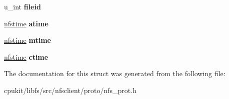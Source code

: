 \begin{DoxyCompactItemize}
u\+\_\+int {\bfseries fileid}
\item 
\mbox{\label{structfattr_a239bf926405939668919b53f07dfe603}} 
\mbox{\hyperlink{structnfstime}{nfstime}} {\bfseries atime}
\item 
\mbox{\label{structfattr_a9d8ab44fb315be7404c8f53b60edd9c6}} 
\mbox{\hyperlink{structnfstime}{nfstime}} {\bfseries mtime}
\item 
\mbox{\label{structfattr_ad7e8aa1ed30748580a398aad7e765c55}} 
\mbox{\hyperlink{structnfstime}{nfstime}} {\bfseries ctime}
\end{DoxyCompactItemize}


The documentation for this struct was generated from the following file\+:\begin{DoxyCompactItemize}
\item 
cpukit/libfs/src/nfsclient/proto/nfs\+\_\+prot.\+h\end{DoxyCompactItemize}
